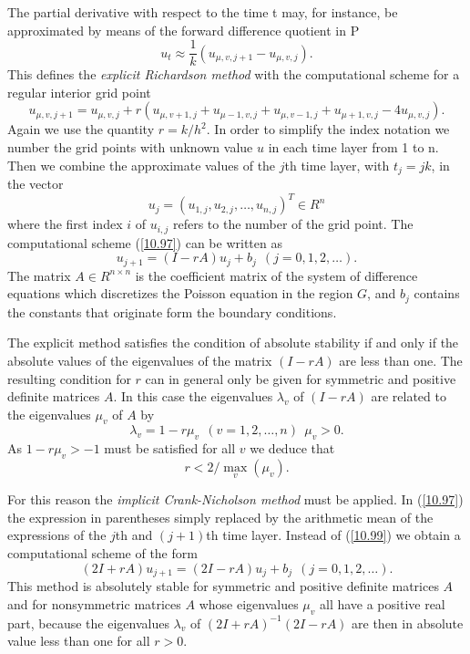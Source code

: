 \documentclass[11pt]{article}
\begin{document}
The partial derivative with respect to the time t may, for instance,
be approximated by means of the forward difference quotient in P
\[ u_{t} \approx \frac{1}{k}(u_{\mu,v,j+1}-u_{\mu,v,j}).\]
This defines the {\em explicit Richardson method} with the
computational scheme for a regular interior grid point
\begin{equation}
u_{\mu,v,j+1} = u_{\mu,v,j} +
r(u_{\mu,v+1,j}+u_{\mu-1,v,j}+u_{\mu,v-1,j}+u_{\mu+1,v,j}-4u_{\mu,v,j}).
 \label{10.97}
\end{equation}
Again we use the quantity $r = k/h^2$. In order to simplify the index
notation we number the grid points with unknown value $u$ in each time
layer from 1 to n. Then we combine the approximate values of the $j$th
time layer, with $t_{j} = jk$, in the vector
\begin{equation}
u_{j} = (u_{1,j}, u_{2,j}, \ldots , u_{n,j})^T \in R^n  \label{10.98}
\end{equation}
where the first index $i$ of $u_{i,j}$ refers to the number of the
grid point. The computational scheme (\ref{10.97}) can be written as
\begin{equation}
u_{j+1} = (I - rA)u_j + b_{j} \ \ (j = 0,1,2,\ldots). \label{10.99}
\end{equation}
The matrix $A \in R^{n \times n}$ is the coefficient matrix of the
system of difference equations which discretizes the Poisson equation
in the region $G$, and $b_j$ contains the constants that originate
form the boundary conditions.

The explicit method satisfies the condition of absolute stability if
and only if the absolute values of the eigenvalues of the matrix
$(I-rA)$ are less than one. The resulting condition for $r$ can in
general only be given for symmetric and positive definite matrices
$A$. In this case the eigenvalues $\lambda_v$ of $(I-rA)$ are related
to the eigenvalues $\mu_v$ of $A$ by
\[ \lambda_v = 1 - r \mu_v \ \ (v = 1,2,\ldots,n) \ \ \mu_v > 0. \] 
As $1-r\mu_v>-1$ must be satisfied for all $v$ we deduce that
\begin{equation}
r < 2/\max_v(\mu_v).  \label{10.100}
\end{equation}

For this reason the {\em implicit Crank-Nicholson method} must be
applied. In (\ref{10.97}) the expression in parentheses simply
replaced by the arithmetic mean of the expressions of the $j$th and
$(j+1)$th time layer. Instead of (\ref{10.99}) we obtain a computational
scheme  of the form
\begin{equation}
(2I + rA )u_{j+1} = (2I - rA)u_j + b_j \ \ (j = 0,1,2,\ldots). \label{10.102}
\end{equation}
This method is absolutely stable for symmetric and positive definite
matrices $A$ and for nonsymmetric matrices $A$ whose eigenvalues $\mu_v$
all have a positive real part, because the eigenvalues $\lambda_v$ of
$(2I + rA)^{-1} (2I-rA)$ are then in absolute value less than one for
all $r>0$.
\end{document}
